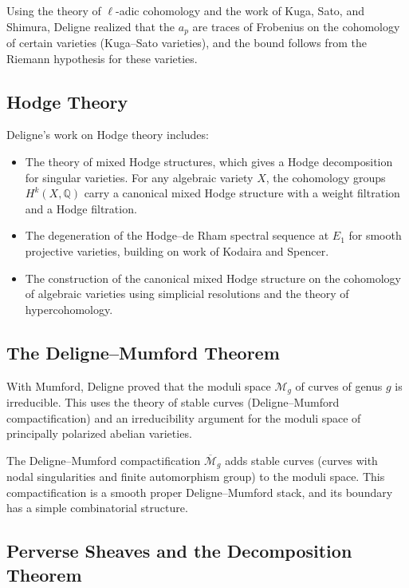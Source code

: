 Using the theory of $\ell$-adic cohomology and the work of Kuga, Sato, and Shimura, Deligne realized that the $a_p$ are traces of Frobenius on the cohomology of certain varieties (Kuga--Sato varieties), and the bound follows from the Riemann hypothesis for these varieties.

\subsection{Hodge Theory}

Deligne's work on Hodge theory includes:
\begin{itemize}
\item The theory of mixed Hodge structures, which gives a Hodge decomposition for singular varieties. For any algebraic variety $X$, the cohomology groups $H^k(X, \mathbb{Q})$ carry a canonical mixed Hodge structure with a weight filtration and a Hodge filtration.
\item The degeneration of the Hodge--de Rham spectral sequence at $E_1$ for smooth projective varieties, building on work of Kodaira and Spencer.
\item The construction of the canonical mixed Hodge structure on the cohomology of algebraic varieties using simplicial resolutions and the theory of hypercohomology.
\end{itemize}

\subsection{The Deligne--Mumford Theorem}

With Mumford, Deligne proved that the moduli space $\mathcal{M}_g$ of curves of genus $g$ is irreducible. This uses the theory of stable curves (Deligne--Mumford compactification) and an irreducibility argument for the moduli space of principally polarized abelian varieties.

The Deligne--Mumford compactification $\overline{\mathcal{M}}_g$ adds stable curves (curves with nodal singularities and finite automorphism group) to the moduli space. This compactification is a smooth proper Deligne--Mumford stack, and its boundary has a simple combinatorial structure.

\subsection{Perverse Sheaves and the Decomposition Theorem}

